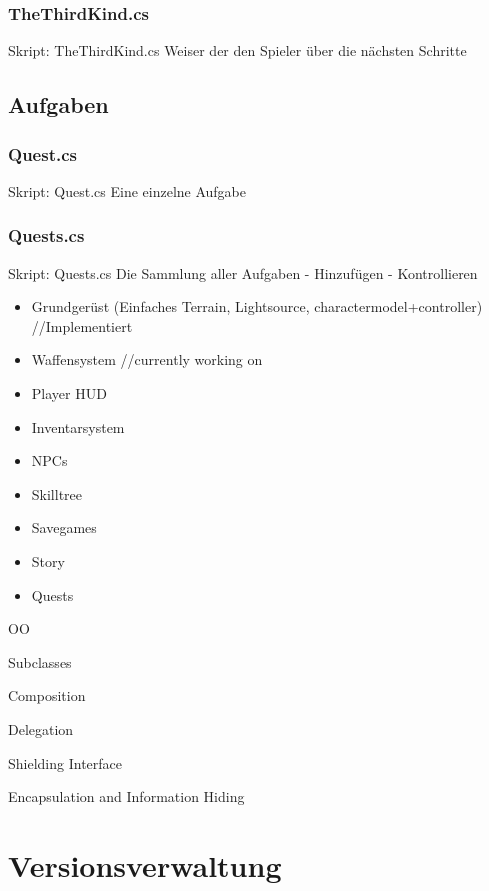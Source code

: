 \subsubsection{TheThirdKind.cs}
Skript: TheThirdKind.cs
Weiser der den Spieler über die nächsten Schritte

\subsection{Aufgaben}

\subsubsection{Quest.cs}
Skript: Quest.cs
Eine einzelne Aufgabe

\subsubsection{Quests.cs}
Skript: Quests.cs
Die Sammlung aller Aufgaben
- Hinzufügen
- Kontrollieren

\begin{itemize}
\item Grundgerüst (Einfaches Terrain, Lightsource, charactermodel+controller) //Implementiert
\item Waffensystem	//currently working on
\item Player HUD
\item Inventarsystem
\item NPCs
\item Skilltree
\item Savegames
\item Story
\item Quests

\end{itemize}




OO

Subclasses

Composition

Delegation

Shielding Interface

Encapsulation and Information Hiding


\section{Versionsverwaltung}


